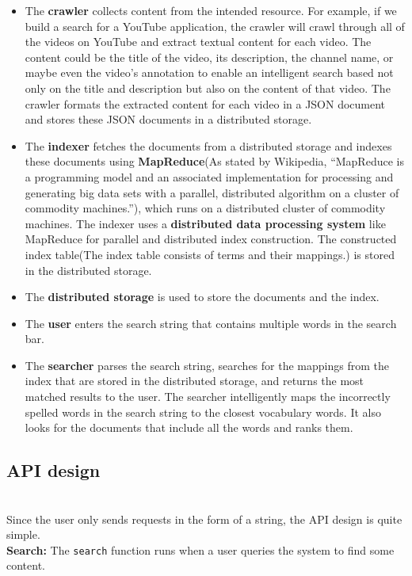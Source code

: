 \begin{itemize}
\item
\protect{}\label{Vq-b3tzVc_vpgjKYkWeC3}
The \textbf{crawler} collects content from the intended resource. For example, if we build a search for a YouTube application, the crawler will crawl through all of the videos on YouTube and extract textual content for each video. The content could be the title of the video, its description, the channel name, or maybe even the video's annotation to enable an intelligent search based not only on the title and description but also on the content of that video. The crawler formats the extracted content for each video in a JSON document and stores these JSON documents in a distributed storage.
\item
\protect{}\label{fW6_HvTOD8SkwbyEOCrlh}
The \textbf{indexer} fetches the documents from a distributed storage and indexes these documents using \textbf{MapReduce}(As stated by Wikipedia, ``MapReduce is a programming model and an associated implementation for processing and generating big data sets with a parallel, distributed algorithm on a cluster of commodity machines.''), which runs on a distributed cluster of commodity machines. The indexer uses a \textbf{distributed data processing system} like MapReduce for parallel and distributed index construction. The constructed index table(The index table consists of terms and their mappings.) is stored in the distributed storage.
\item
\protect{}\label{vlWkNBFPveN_xq-RLq-wV}
The \textbf{distributed storage} is used to store the documents and the index.
\item
\protect{}\label{tl-GznbFcDFWYp2Rzm6mY}
The \textbf{user} enters the search string that contains multiple words in the search bar.
\item
\protect{}\label{HfuPU_UBQs3hCLJah04ww}
The \textbf{searcher} parses the search string, searches for the mappings from the index that are stored in the distributed storage, and returns the most matched results to the user. The searcher intelligently maps the incorrectly spelled words in the search string to the closest vocabulary words. It also looks for the documents that include all the words and ranks them.
\end{itemize}

\subsection{API design}\label{ANsK5BLtlt2Z0OfcrxaL2}
\\
Since the user only sends requests in the form of a string, the API design is quite simple.
\\
\textbf{Search:} The \texttt{search} function runs when a user queries the system to find some content.

